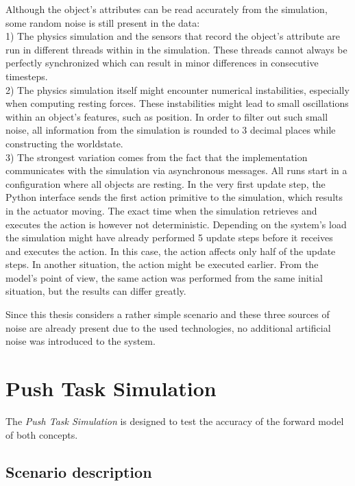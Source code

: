 Although the object's attributes can be read accurately from the simulation, some random noise is still present in the data: \\
1) The physics simulation and the sensors that record the object's attribute are run in different threads within
in the simulation. These threads cannot always be perfectly synchronized which can result in minor differences in consecutive 
timesteps. \\
2) The physics simulation itself might encounter numerical instabilities, especially when computing resting forces. These instabilities
might lead to small oscillations within an object's features, such as position. In order to filter out such small noise, all
information from the simulation is rounded to 3 decimal places while constructing the worldstate. \\
3) The strongest variation comes from the fact that the implementation communicates with the simulation via asynchronous messages. 
All runs start in a configuration where all objects are resting. In the very first update step, the Python interface sends the first
action primitive to the simulation, which results in the actuator moving. The exact time when the simulation retrieves and executes
the action is however not deterministic. Depending on the system's load the simulation might have already performed 5 update steps before
it receives and executes the action. In this case, the action affects only half of the update steps. In another situation, the action might
be executed earlier. From the model's point of view, the same action was performed from the same initial situation, but the results can
differ greatly. 

Since this thesis considers a rather simple scenario and these three sources of noise are already present due to the used technologies,
no additional artificial noise was introduced to the system.

\section{Push Task Simulation \label{sec:pushTaskSim}}

The \textit{Push Task Simulation} is designed to test the accuracy of the forward model of both concepts. 

\subsection{Scenario description}

